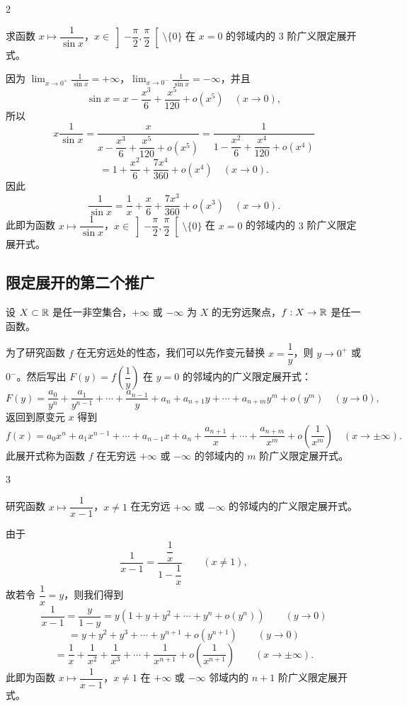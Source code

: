 \begin{sourceexample}{2}

求函数 $x\longmapsto\dfrac{1}{\sin x}$，$x\in\left]-\dfrac{\pi}{2},\dfrac{\pi}{2}\right[\setminus\{0\}$ 在 $x=0$ 的邻域内的 $3$ 阶广义限定展开式。

因为 $\displaystyle\lim_{x\to0^+}\frac{1}{\sin x}=+\infty$，$\displaystyle\lim_{x\to0^-}\frac{1}{\sin x}=-\infty$，并且
\[\sin x=x-\frac{x^3}{6}+\frac{x^5}{120}+o(x^5)\quad(x\to0),\]
所以
\[x\frac{1}{\sin x}=\frac{x}{x-\dfrac{x^3}{6}+\dfrac{x^5}{120}+o(x^5)}=\frac{1}{1-\dfrac{x^2}{6}+\dfrac{x^4}{120}+o(x^4)}\]
\[=1+\frac{x^2}{6}+\frac{7x^4}{360}+o(x^4)\quad(x\to0).\]
因此
\[\frac{1}{\sin x}=\frac{1}{x}+\frac{x}{6}+\frac{7x^3}{360}+o(x^3)\quad(x\to0).\]
此即为函数 $x\longmapsto\dfrac{1}{\sin x}$，$x\in\left]-\dfrac{\pi}{2},\dfrac{\pi}{2}\right[\setminus\{0\}$ 在 $x=0$ 的邻域内的 $3$ 阶广义限定展开式。

\end{sourceexample}

\subsection{限定展开的第二个推广}

设 $X\subset\mathbb{R}$ 是任一非空集合，$+\infty$ 或 $-\infty$ 为 $X$ 的无穷远聚点，$f:X\to\mathbb{R}$ 是任一函数。

为了研究函数 $f$ 在无穷远处的性态，我们可以先作变元替换 $x=\dfrac{1}{y}$，则 $y\to0^+$ 或 $0^-$。然后写出 $F(y)=f\left(\dfrac{1}{y}\right)$ 在 $y=0$ 的邻域内的广义限定展开式：
\[F(y)=\frac{a_0}{y^n}+\frac{a_1}{y^{n-1}}+\cdots+\frac{a_{n-1}}{y}+a_n+a_{n+1}y+\cdots+a_{n+m}y^m+o(y^m)\quad(y\to0),\]
返回到原变元 $x$ 得到
\[f(x)=a_0x^n+a_1x^{n-1}+\cdots+a_{n-1}x+a_n+\frac{a_{n+1}}{x}+\cdots+\frac{a_{n+m}}{x^m}+o\left(\frac{1}{x^m}\right)\quad(x\to\pm\infty).\]
此展开式称为函数 $f$ 在无穷远 $+\infty$ 或 $-\infty$ 的邻域内的 $m$ 阶广义限定展开式。

\begin{sourceexample}{3}

研究函数 $x\longmapsto\dfrac{1}{x-1}$，$x\neq1$ 在无穷远 $+\infty$ 或 $-\infty$ 的邻域内的广义限定展开式。

由于
\[\frac{1}{x-1}=\frac{\dfrac{1}{x}}{1-\dfrac{1}{x}}\qquad(x\neq1),\]
故若令 $\dfrac{1}{x}=y$，则我们得到
\[\frac{1}{x-1}=\frac{y}{1-y}=y(1+y+y^2+\cdots+y^n+o(y^n))\qquad(y\to0)\]
\[=y+y^2+y^3+\cdots+y^{n+1}+o(y^{n+1})\qquad(y\to0)\]
\[=\frac{1}{x}+\frac{1}{x^2}+\frac{1}{x^3}+\cdots+\frac{1}{x^{n+1}}+o\left(\frac{1}{x^{n+1}}\right)\qquad(x\to\pm\infty).\]
此即为函数 $x\longmapsto\dfrac{1}{x-1}$，$x\neq1$ 在 $+\infty$ 或 $-\infty$ 邻域内的 $n+1$ 阶广义限定展开式。

\end{sourceexample}

